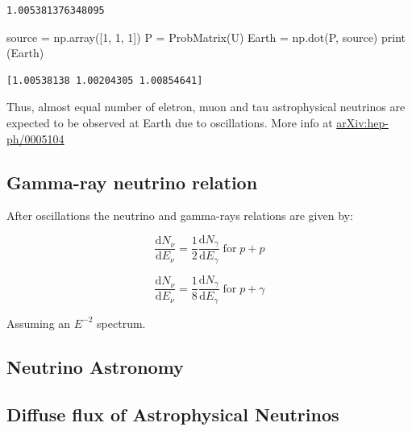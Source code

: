 \documentclass[
  letterpaper,
  DIV=11,
  numbers=noendperiod]{scrreprt}
\newenvironment{Shaded}{\begin{snugshade}}{\end{snugshade}}
\newcommand{\BuiltInTok}[1]{\textcolor[rgb]{0.00,0.23,0.31}{#1}}
\newcommand{\DecValTok}[1]{\textcolor[rgb]{0.68,0.00,0.00}{#1}}
\newcommand{\NormalTok}[1]{\textcolor[rgb]{0.00,0.23,0.31}{#1}}
\newcommand{\OperatorTok}[1]{\textcolor[rgb]{0.37,0.37,0.37}{#1}}
\begin{document}
\begin{verbatim}
1.005381376348095
\end{verbatim}

\begin{Shaded}
\begin{Highlighting}[]
\NormalTok{source }\OperatorTok{=}\NormalTok{ np.array([}\DecValTok{1}\NormalTok{, }\DecValTok{1}\NormalTok{, }\DecValTok{1}\NormalTok{])}
\NormalTok{P }\OperatorTok{=}\NormalTok{ ProbMatrix(U)}
\NormalTok{Earth }\OperatorTok{=}\NormalTok{ np.dot(P, source)}
\BuiltInTok{print}\NormalTok{ (Earth)}
\end{Highlighting}
\end{Shaded}

\begin{verbatim}
[1.00538138 1.00204305 1.00854641]
\end{verbatim}

Thus, almost equal number of eletron, muon and tau astrophysical
neutrinos are expected to be observed at Earth due to oscillations. More
info at \href{http://arxiv.org/abs/hep-ph/0005104}{arXiv:hep-ph/0005104}

\subsection{Gamma-ray neutrino
relation}\label{gamma-ray-neutrino-relation}

After oscillations the neutrino and gamma-rays relations are given by:

\[\frac{\mathrm{ d}N_\nu}{\mathrm{ d}E_\nu} = \frac{1}{2}\frac{\mathrm{ d}N_\gamma}{\mathrm{ d}E_\gamma} \mathrm{\; for\;} p + p\]

\[\frac{\mathrm{ d}N_\nu}{\mathrm{ d}E_\nu} = \frac{1}{8}\frac{\mathrm{ d}N_\gamma}{\mathrm{ d}E_\gamma} \mathrm{\; for\;} p + \gamma\]

Assuming an \(E^{-2}\) spectrum.

\subsection{Neutrino Astronomy}\label{neutrino-astronomy}

\subsection{Diffuse flux of Astrophysical
Neutrinos}\label{diffuse-flux-of-astrophysical-neutrinos}
\end{document}
